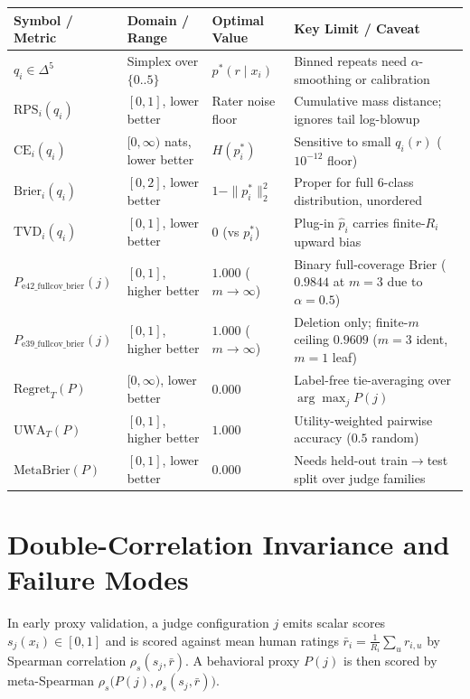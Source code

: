\documentclass[11pt]{article}
\begin{document}
\begin{center}
\footnotesize
\setlength{\tabcolsep}{4pt}
\begin{tabular}{@{}lll>{\raggedright\arraybackslash}p{6.1cm}@{}}
\toprule
Symbol / Metric & Domain / Range & Optimal Value & Key Limit / Caveat \\
\midrule
$q_i \in \Delta^5$ & Simplex over $\{0..5\}$ & $p^*(r \mid x_i)$ & Binned repeats need $\alpha$-smoothing or calibration \\
$\mathrm{RPS}_i(q_i)$ & $[0, 1]$, lower better & Rater noise floor & Cumulative mass distance; ignores tail log-blowup \\
$\mathrm{CE}_i(q_i)$ & $[0, \infty)$ nats, lower better & $H(p^*_i)$ & Sensitive to small $q_i(r)$ ($10^{-12}$ floor) \\
$\mathrm{Brier}_i(q_i)$ & $[0, 2]$, lower better & $1 - \|p^*_i\|_2^2$ & Proper for full 6-class distribution, unordered \\
$\mathrm{TVD}_i(q_i)$ & $[0, 1]$, lower better & $0$ (vs $p^*_i$) & Plug-in $\hat p_i$ carries finite-$R_i$ upward bias \\
$P_{\mathrm{e42\_fullcov\_brier}}(j)$ & $[0, 1]$, higher better & $1.000$ ($m\to\infty$) & Binary full-coverage Brier ($0.9844$ at $m=3$ due to $\alpha=0.5$) \\
$P_{\mathrm{e39\_fullcov\_brier}}(j)$ & $[0, 1]$, higher better & $1.000$ ($m\to\infty$) & Deletion only; finite-$m$ ceiling $0.9609$ ($m=3$ ident, $m=1$ leaf) \\
$\mathrm{Regret}_T(P)$ & $[0, \infty)$, lower better & $0.000$ & Label-free tie-averaging over $\arg\max_j P(j)$ \\
$\mathrm{UWA}_T(P)$ & $[0, 1]$, higher better & $1.000$ & Utility-weighted pairwise accuracy ($0.5$ random) \\
$\mathrm{MetaBrier}(P)$ & $[0, 1]$, lower better & $0.000$ & Needs held-out train$\to$test split over judge families \\
\bottomrule
\end{tabular}
\end{center}

\section{Double-Correlation Invariance and Failure Modes}

In early proxy validation, a judge configuration $j$ emits scalar scores $s_j(x_i) \in [0, 1]$ and is scored against mean human ratings $\bar r_i = \frac{1}{R_i}\sum_u r_{i,u}$ by Spearman correlation $\rho_s(s_j, \bar r)$. A behavioral proxy $P(j)$ is then scored by meta-Spearman $\rho_s\bigl(P(j), \rho_s(s_j, \bar r)\bigr)$.
\end{document}
